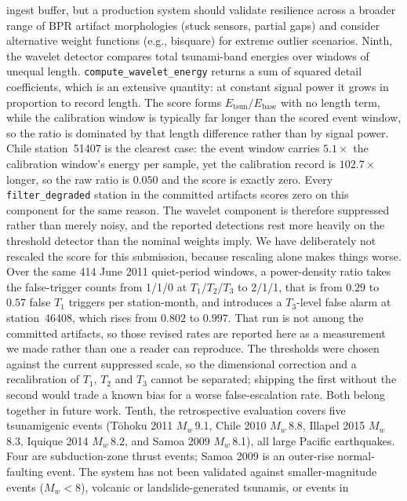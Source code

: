 \documentclass{article}
\begin{document}
ingest buffer, but a production system should validate resilience
across a broader range of BPR artifact morphologies (stuck sensors,
partial gaps) and consider alternative weight functions (e.g.,
bisquare) for extreme outlier scenarios.
Ninth, the wavelet detector compares total tsunami-band energies over
windows of unequal length.  \texttt{compute\_wavelet\_energy} returns a
sum of squared detail coefficients, which is an extensive quantity: at
constant signal power it grows in proportion to record length.  The
score forms $E_\text{tsun}/E_\text{base}$ with no length term, while
the calibration window is typically far longer than the scored event
window, so the ratio is dominated by that length difference rather
than by signal power.  Chile station~51407 is the clearest case: the
event window carries $5.1\times$ the calibration window's energy per
sample, yet the calibration record is $102.7\times$ longer, so the raw
ratio is $0.050$ and the score is exactly zero.  Every
\texttt{filter\_degraded} station in the committed artifacts scores
zero on this component for the same reason.  The wavelet component is
therefore suppressed rather than merely noisy, and the reported
detections rest more heavily on the threshold detector than the
nominal weights imply.  We have deliberately not rescaled the score
for this submission, because rescaling alone makes things worse.  Over
the same 414 June 2011 quiet-period windows, a power-density ratio
takes the false-trigger counts from 1/1/0 at $T_1$/$T_2$/$T_3$ to
2/1/1, that is from $0.29$ to $0.57$ false $T_1$ triggers per
station-month, and introduces a $T_3$-level false alarm at
station~46408, which rises from $0.802$ to $0.997$.  That run is not
among the committed artifacts, so those revised rates are reported
here as a measurement we made rather than one a reader can
reproduce.  The thresholds were chosen against the current suppressed
scale, so the dimensional correction and a recalibration of $T_1$,
$T_2$ and $T_3$ cannot be separated; shipping the first without the
second would trade a known bias for a worse false-escalation rate.
Both belong together in future work.
Tenth, the retrospective evaluation covers five tsunamigenic events
(T\={o}hoku 2011 $M_w$\,9.1, Chile 2010 $M_w$\,8.8, Illapel 2015
$M_w$\,8.3, Iquique 2014 $M_w$\,8.2, and Samoa 2009 $M_w$\,8.1),
all large Pacific earthquakes.  Four are subduction-zone thrust events;
Samoa 2009 is an outer-rise normal-faulting event.
The system has not been validated against smaller-magnitude events
($M_w < 8$), volcanic or landslide-generated tsunamis, or events in
\end{document}
